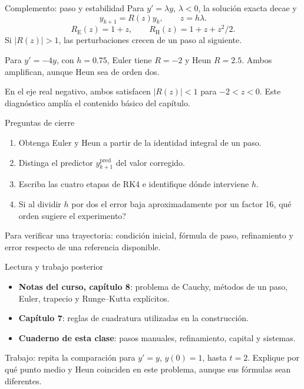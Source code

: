 \documentclass[aspectratio=169,12pt]{beamer}
\begin{document}
\begin{frame}{Complemento: paso y estabilidad}
Para $y'=\lambda y$, $\lambda<0$, la solución exacta decae y
\[y_{k+1}=R(z)y_k,\qquad z=h\lambda.\]
\[R_{\mathrm E}(z)=1+z,\qquad
R_{\mathrm H}(z)=1+z+z^2/2.\]
Si $|R(z)|>1$, las perturbaciones crecen de un paso al siguiente.
\medskip

Para $y'=-4y$, con $h=0.75$, Euler tiene $R=-2$ y Heun $R=2.5$.
Ambos amplifican, aunque Heun sea de orden dos.
\medskip

\small En el eje real negativo, ambos satisfacen $|R(z)|<1$ para $-2<z<0$.
Este diagnóstico amplía el contenido básico del capítulo.
\end{frame}

\begin{frame}{Preguntas de cierre}
\begin{enumerate}
\item Obtenga Euler y Heun a partir de la identidad integral de un paso.
\item Distinga el predictor $y_{k+1}^{\mathrm{pred}}$ del valor corregido.
\item Escriba las cuatro etapas de RK4 e identifique dónde interviene $h$.
\item Si al dividir $h$ por dos el error baja aproximadamente por un factor 16,
\textquestiondown qué orden sugiere el experimento?
\end{enumerate}
\medskip
Para verificar una trayectoria: condición inicial, fórmula de paso, refinamiento y error respecto de una referencia disponible.
\end{frame}

\begin{frame}{Lectura y trabajo posterior}
\begin{itemize}
\item \textbf{Notas del curso, capítulo 8}: problema de Cauchy, métodos de un paso,
Euler, trapecio y Runge--Kutta explícitos.
\item \textbf{Capítulo 7}: reglas de cuadratura utilizadas en la construcción.
\item \textbf{Cuaderno de esta clase}: pasos manuales, refinamiento, capital y sistemas.
\end{itemize}
\medskip
Trabajo: repita la comparación para $y'=y$, $y(0)=1$, hasta $t=2$.
Explique por qué punto medio y Heun coinciden en este problema, aunque sus fórmulas sean diferentes.
\end{frame}
\end{document}
